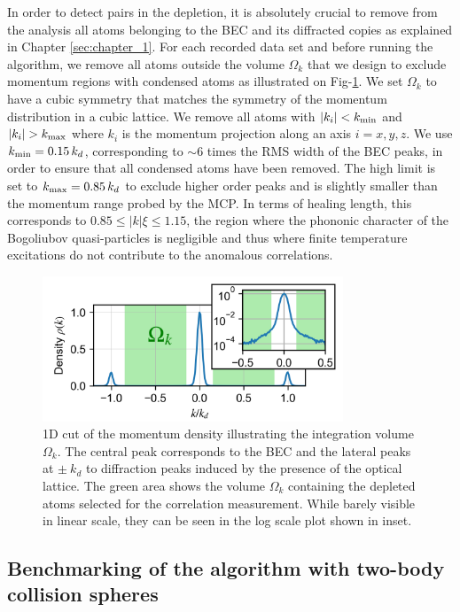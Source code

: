 In order to detect \kmk pairs in the depletion, it is absolutely crucial to remove from the analysis all atoms belonging to the BEC and its diffracted copies as explained in Chapter \ref{sec:chapter_1}. For each recorded data set and before running the algorithm, we remove all atoms outside the volume $\Omega_k$ that we design to exclude momentum regions with condensed atoms as illustrated on Fig-\ref{fig:omega_k}. We set $\Omega_k$ to have a cubic symmetry that matches the symmetry of the momentum distribution in a cubic lattice. We remove all atoms with $|k_i| < k_{\rm{min}}$ and $|k_i| > k_{\rm{max}}$ where $k_i$ is the momentum projection along an axis $i=x,y,z$. We use $k_{\rm{min}}=0.15 \, k_d$, corresponding to $\sim 6$ times the RMS width of the BEC peaks, in order to ensure that all condensed atoms have been removed. The high limit is set to $k_{\rm{max}}=0.85 \, k_d$ to exclude higher order peaks and is slightly smaller than the momentum range probed by the MCP. In terms of healing length, this corresponds to $0.85 \leq | k | \xi \leq 1.15$, \ie the region where the phononic character of the Bogoliubov quasi-particles is negligible and thus where finite temperature excitations do not contribute to the anomalous correlations. 

\begin{figure}
    \centering
    \includegraphics[width=0.8\textwidth]{Fig/Chapter4/densite.png}
    \caption[1D cut of the momentum density illustrating the integration volume $\Omega_k$]{1D cut of the momentum density illustrating the integration volume $\Omega_k$. The central peak corresponds to the BEC and the lateral peaks at $\pm \ k_d$ to diffraction peaks induced by the presence of the optical lattice. The green area shows the volume $\Omega_k$ containing the depleted atoms selected for the correlation measurement. While barely visible in linear scale, they can be seen in the log scale plot shown in inset.}
    \label{fig:omega_k}
\end{figure}

\subsection{Benchmarking of the algorithm with two-body collision spheres}

